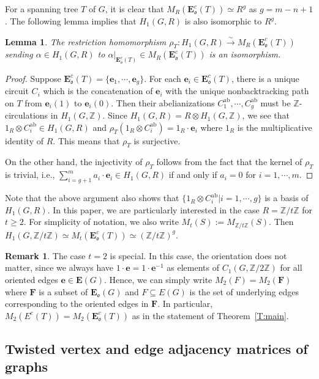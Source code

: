 \documentclass[11pt]{amsart}
\theoremstyle{plain}
\newtheorem{lemma}[theorem]{Lemma}
\theoremstyle{definition}
\newtheorem{remark}[theorem]{Remark}
\newcommand{\mbbZ}{{\mathbb Z}}
\newcommand{\mfrako}{{\mathfrak o}}
\newcommand{\ve}{{\mathbf e}}
\newcommand{\vE}{{\mathbf E}}
\newcommand{\vF}{{\mathbf F}}
\DeclareMathOperator{\ab}{\operatorname{ab}}
\numberwithin{equation}{section}
\begin{document}
For a spanning tree $T$ of $G$, it is clear that $M_R(\vE_\mfrako^c(T))\simeq R^g$ as $g=m-n+1$. The following lemma implies that $H_1(G,R)$ is also isomorphic to $R^g$. 

\begin{lemma} \label{L:rhoT}
The restriction homomorphism $\rho_T:H_1(G,R) \xrightarrow{\sim} M_R(\vE_\mfrako^c(T)) $ sending $\alpha\in H_1(G,R)$ to $\alpha|_{\vE_\mfrako^c(T)}\in M_R(\vE_\mfrako^c(T))$  is an isomorphism. 
\end{lemma}

\begin{proof}
Suppose $\vE_\mfrako^c(T)=\{\ve_1,\cdots,\ve_g\}$. 
For each $\ve_i\in \vE_\mfrako^c(T)$, there is a unique circuit $C_i$ which is the concatenation of $\ve_i$ with the unique nonbacktracking path on $T$ from $\ve_i(1)$ to $\ve_i(0)$. 
Then their abelianizations  $C^{\ab}_1,\cdots,C^{\ab}_g$ must be $\mbbZ$-circulations in $H_1(G,\mbbZ)$. Since $H_1(G,R)=R\otimes H_1(G,\mbbZ)$, we see that $1_R\otimes C^{\ab}_i\in H_1(G,R)$ and $\rho_T(1_R\otimes C^{\ab}_i)=1_R\cdot \ve_i$ where $1_R$ is the multiplicative identity of $R$. This means that $\rho_T$ is surjective. 

On the other hand, the injectivity of $\rho_T$ follows from the fact that the kernel of $\rho_T$ is trivial, i.e., $\sum_{i=g+1}^m a_i\cdot \ve_i\in H_1(G,R)$ if and only if $a_i=0$ for $i=1,\cdots,m$. 
\end{proof}

Note that the above argument also shows that $\{1_R\otimes C^{\ab}_i|i=1,\cdots,g\}$ is a basis of $H_1(G,R)$. In this paper, we are particularly interested in the case $R=\mbbZ/t\mbbZ$ for $t\geq 2$. For simplicity of notation, we also write $M_t(S) := M_{\mbbZ/t\mbbZ}(S)$. Then $H_1(G,\mbbZ/t\mbbZ) \simeq M_t(\vE_\mfrako^c(T) )\simeq(\mbbZ/t\mbbZ)^g$. 

\begin{remark} \label{R:caset2}
The case $t=2$ is special. In this case, the orientation does not matter, since we always have  $1\cdot \ve = 1\cdot \ve^{-1}$ as elements of $C_1(G,\mbbZ/2\mbbZ)$ for all oriented edges $\ve\in\vE(G)$.  Hence, we can simply write $M_2(F)=M_2(\vF)$ where $\vF$ is a subset of $\vE_\mfrako(G)$ and $F\subseteq E(G)$ is the set of underlying edges corresponding to the oriented edges in $\vF$. In particular, $M_2(E^c(T))=M_2(\vE_\mfrako^c(T))$ as in the statement of Theorem~\ref{T:main}.
\end{remark}

\subsection{Twisted vertex and edge adjacency matrices of graphs}
\end{document}

